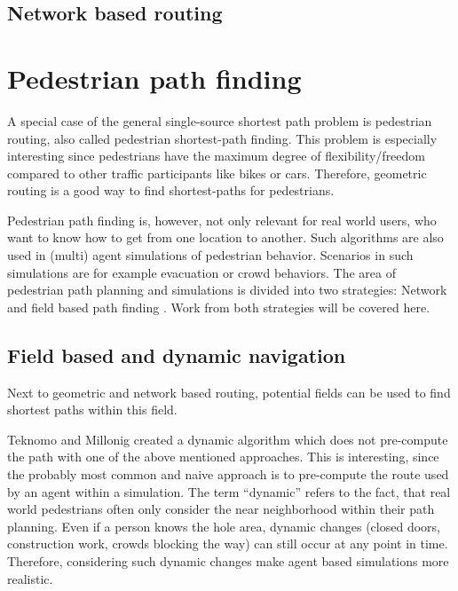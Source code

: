 	\subsection{Network based routing}
	

\section{Pedestrian path finding}
\label{sec:pedestrian-path-planning}
	
	A special case of the general single-source shortest path problem is pedestrian routing, also called pedestrian shortest-path finding.
	This problem is especially interesting since pedestrians have the maximum degree of flexibility/freedom compared to other traffic participants like bikes or cars.
	Therefore, geometric routing is a good way to find shortest-paths for pedestrians.
	
	Pedestrian path finding is, however, not only relevant for real world users, who want to know how to get from one location to another.
	Such algorithms are also used in (multi) agent simulations of pedestrian behavior.
	Scenarios in such simulations are for example evacuation or crowd behaviors.
	The area of pedestrian path planning and simulations is divided into two strategies: Network and field based path finding \cite{hartmann-geodesic}.
	Work from both strategies will be covered here.
	
	\subsection{Field based and dynamic navigation}
	
		Next to geometric and network based routing, potential fields can be used to find shortest paths within this field.
		
		Teknomo and Millonig created a dynamic algorithm which does not pre-compute the path with one of the above mentioned approaches\cite{teknomo-millonig-routing}.
		This is interesting, since the probably most common and naive approach is to pre-compute the route used by an agent within a simulation.
		The term \enquote{dynamic} refers to the fact, that real world pedestrians often only consider the near neighborhood within their path planning.
		Even if a person knows the hole area, dynamic changes (closed doors, construction work, crowds blocking the way) can still occur at any point in time.
		Therefore, considering such dynamic changes make agent based simulations more realistic.
		

